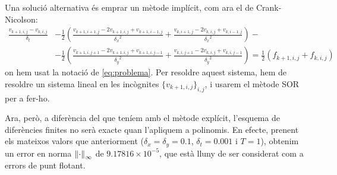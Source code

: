\documentclass[10pt,a4paper]{article}
\theoremstyle{definition}
\theoremstyle{remark}
\begin{document}
Una solució alternativa és emprar un mètode implícit, com ara el de Crank-Nicolson:
\begin{align*}
  \frac{v_{k+1,i,j}-v_{k,i,j}}{\delta_t} & - \frac{1}{2}\left(\frac{v_{k+1,i+1,j}-2v_{k+1,i,j}+v_{k+1,i-1,j}}{{\delta_x}^2} +\frac{v_{k,i+1,j}-2v_{k,i,j}+v_{k,i-1,j}}{{\delta_x}^2} \right)  -                                             \\
                                         & -\frac{1}{2}\left( \frac{v_{k+1,i,j+1}-2v_{k+1,i,j}+v_{k+1,i,j-1}}{{\delta_y}^2}+ \frac{v_{k,i,j+1}-2v_{k,i,j}+v_{k,i,j-1}}{{\delta_y}^2}\right) = \frac{1}{2}\left(f_{k+1,i,j}+f_{k,i,j}\right)
\end{align*}
on hem usat la notació de \eqref{eq:problema}. Per resoldre aquest sistema, hem de resoldre un sistema lineal en les incògnites $\{v_{k+1,i,j}\}_{i,j}$, i usarem el mètode SOR per a fer-ho.

Ara, però, a diferència del que teníem amb el mètode explícit, l'esquema de diferències finites no serà exacte quan l'apliquem a polinomis. En efecte, prenent els mateixos valors que anteriorment ($\delta_x=\delta_y=0.1$, $\delta_t=0.001$ i $T=1$), obtenim un error en norma $\norm{\cdot}_\infty$ de $9.17816\times 10^{-5}$, que està lluny de ser considerat com a errors de punt flotant.
\end{document}
